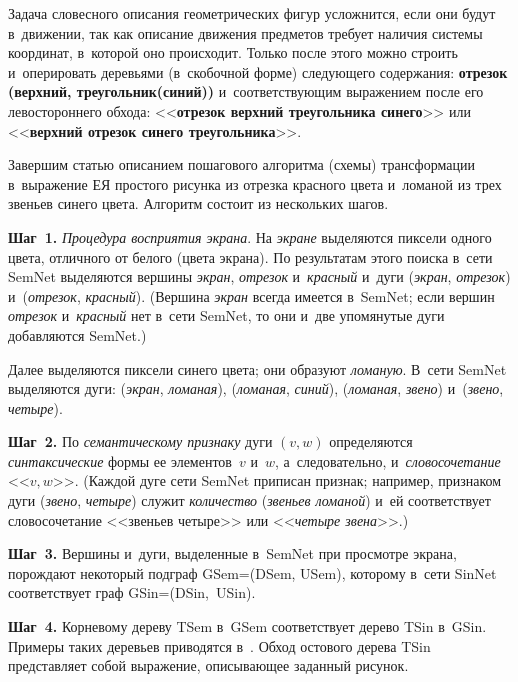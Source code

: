 \begin{multicols}{2}
  Задача словесного описания геометрических фигур услож\-нит\-ся, если 
они будут в~движении, так как описание движения пред\-ме\-тов требует 
наличия сис\-те\-мы координат, в~которой оно происходит. Только после 
этого мож\-но строить и~оперировать деревьями (в~скобочной 
форме) сле\-ду\-юще\-го содержания: \textbf{отрезок (верхний, 
треугольник(синий))} и~со\-от\-вет\-ст\-ву\-ющим выражением после его 
левостороннего обхода: <<\textbf{отрезок верхний треугольника 
синего}>> или <<\textbf{верхний отрезок синего треугольника}>>.
  
  Завершим статью описанием пошагового алгоритма (схемы) 
транс\-фор\-ма\-ции в~выражение ЕЯ прос\-то\-го рисунка из отрезка крас\-но\-го 
цвета и~ломаной из трех звень\-ев синего цвета. Алгоритм со\-сто\-ит из 
нескольких шагов.
  
  \textbf{Шаг~1.} \textit{Процедура восприятия экрана}. На \textit{экране} 
выделяются пиксели одного цвета, отличного от белого (цвета экрана). По 
результатам этого поиска в~сети SemNet выделяются вершины 
\textit{экран}, \textit{отрезок} и~\textit{красный} и~дуги (\textit{экран}, 
\textit{отрезок}) и~(\textit{отрезок}, \textit{красный}). (Вершина 
\textit{экран} всегда имеется в~SemNet; если вер\-шин \textit{отрезок} 
и~\textit{красный} нет в~сети SemNet, то они и~две упомянутые дуги 
до\-бав\-ля\-ют\-ся SemNet.)
  
  Далее выделяются пик\-се\-ли синего цвета; они образуют \textit{ломаную}. 
В~сети SemNet выделяются дуги: (\textit{экран}, \textit{ломаная}), 
(\textit{ломаная}, \textit{синий}), (\textit{ломаная}, \textit{звено}) 
и~(\textit{звено}, \textit{четыре}).
  
    \textbf{Шаг~2.} По \textit{семантическому признаку} дуги $(v, w)$ определяются 
\textit{синтаксические} формы ее элементов~$v$ и~$w$, а~следовательно, 
и~\textit{словосочетание} <<$v, w$>>. (Каждой дуге сети SemNet 
приписан при\-знак; например, при\-зна\-ком дуги (\textit{звено}, 
\textit{четыре}) служит \textit{количество} (\textit{звеньев ломаной}) и~ей 
соответствует словосочетание <<звеньев четыре>> или <<\textit{четыре 
звена}>>.)
  
    \textbf{Шаг~3.} Вершины и~дуги, выделенные в~SemNet при про\-смот\-ре экрана, 
по\-рож\-да\-ют некоторый подграф GSem\;=\;(DSem, USem), которому в~сети 
SinNet соответствует граф GSin\;=\;(DSin,\ USin).
  
    \textbf{Шаг~4.} Корневому дереву TSem в~GSem соответствует дерево TSin 
  в~GSin. Примеры таких деревьев приводятся в~\cite{5-sh}. Обход остового 
дерева TSin пред\-став\-ля\-ет собой выражение, опи\-сы\-ва\-ющее заданный 
рисунок.


\end{multicols}
